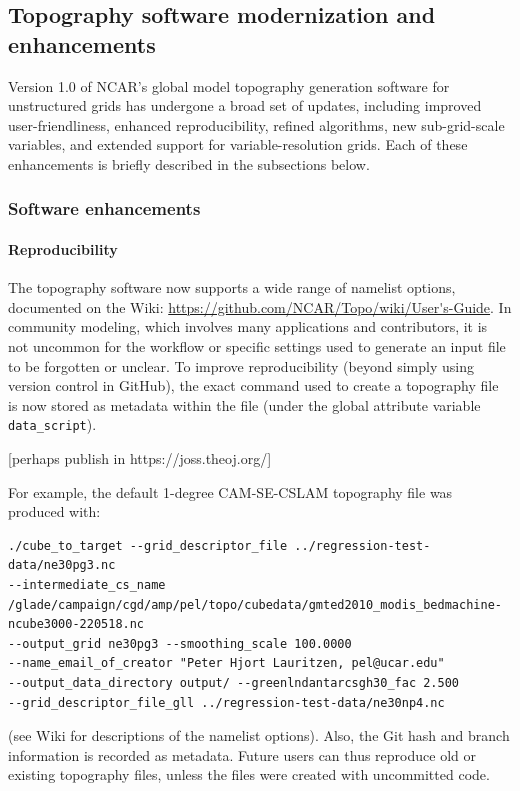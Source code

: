 \documentclass[draft]{agujournal2019}
\begin{document}
\subsection{Topography software modernization and enhancements}
Version 1.0 of NCAR’s global model topography generation software for unstructured grids \cite{LetAl2015GMD} has undergone a broad set of updates, including improved user-friendliness, enhanced reproducibility, refined algorithms, new sub-grid-scale variables, and extended support for variable-resolution grids. Each of these enhancements is briefly described in the subsections below.
\subsubsection{Software enhancements}
\paragraph{Reproducibility}
The topography software now supports a wide range of namelist options, documented on the Wiki: \url{https://github.com/NCAR/Topo/wiki/User's-Guide}. In community modeling, which involves many applications and contributors, it is not uncommon for the workflow or specific settings used to generate an input file to be forgotten or unclear. To improve reproducibility (beyond simply using version control in GitHub), the exact command used to create a topography file is now stored as metadata within the file (under the global attribute variable {\tt{data\_script}}).

[perhaps publish in https://joss.theoj.org/]

For example, the default 1-degree CAM-SE-CSLAM topography file was produced with:
{\begin{verbatim}
./cube_to_target --grid_descriptor_file ../regression-test-data/ne30pg3.nc
--intermediate_cs_name 
/glade/campaign/cgd/amp/pel/topo/cubedata/gmted2010_modis_bedmachine-ncube3000-220518.nc
--output_grid ne30pg3 --smoothing_scale 100.0000
--name_email_of_creator "Peter Hjort Lauritzen, pel@ucar.edu"
--output_data_directory output/ --greenlndantarcsgh30_fac 2.500
--grid_descriptor_file_gll ../regression-test-data/ne30np4.nc
\end{verbatim}}
(see Wiki for descriptions of the namelist options). Also, the Git hash and branch information is recorded as metadata. Future users can thus reproduce old or existing topography files, unless the files were created with uncommitted code.
\end{document}
